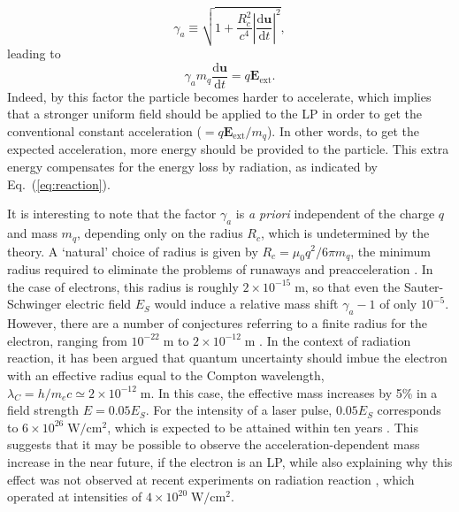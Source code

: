 \documentclass[a4paper,fleqn]{cas-sc}
\begin{document}
\begin{equation}
\gamma_{a} \equiv \sqrt{1 + \displaystyle\frac{R_{c}^{2}}{c^{4}} \left|\displaystyle\frac{\mathrm{d}\mathbf{u}}{\mathrm{d}t}\right|^{2}} , \label{eq:gamma}
\end{equation}
leading to
\begin{equation}
\gamma_{a} m_{q} \displaystyle\frac{\mathrm{d}\mathbf{u}}{\mathrm{d}t} = q\mathbf{E}_{\mathrm{ext}} . \label{eq:motion2}
\end{equation}
Indeed, by this factor the particle becomes harder to accelerate, which implies that a stronger uniform field should be applied to the LP in order to get the conventional constant acceleration ($=q\mathbf{E}_{\mathrm{ext}}/m_{q}$). In other words, to get the expected acceleration, more energy should be provided to the particle. This extra energy compensates for the energy loss by radiation, as indicated by Eq.~(\ref{eq:reaction}).

It is interesting to note that the factor $\gamma_{a}$ is {\it a priori} independent of the charge $q$ and mass $m_{q}$, depending only on the radius $R_{c}$, which is undetermined by the theory. A `natural' choice of radius is given by $R_{c}=\mu_{0}q^{2}/6\pi m_{q}$, the minimum radius required to eliminate the problems of runaways and preacceleration \cite{Levine1977}. In the case of electrons, this radius is roughly $2\times 10^{-15} \;\mathrm{m}$, so that even the Sauter-Schwinger electric field $E_S$ would induce a relative mass shift $\gamma_a-1$ of only $10^{-5}$. However, there are a number of conjectures referring to a finite radius for the electron, ranging from $10^{-22} \;\mathrm{m}$ to $2\times 10^{-12} \;\mathrm{m}$ \cite{Dehmelt1988,Compton1919,Lake2015}. In the context of radiation reaction, it has been argued \cite{Moniz1977} that quantum uncertainty should imbue the electron with an effective radius equal to the Compton wavelength, $\lambda_C=h/m_e c\simeq 2\times 10^{-12} \;\mathrm{m}$. In this case, the effective mass increases by 5\% in a field strength $E=0.05 E_S$. For the intensity of a laser pulse, $0.05 E_{S}$ corresponds to $6\times 10^{26} \;\mathrm{W}/\mathrm{cm}^{2}$, which is expected to be attained within ten years \cite{Mourou2019}. This suggests that it may be possible to observe the acceleration-dependent mass increase in the near future, if the electron is an LP, while also explaining why this effect was not observed at recent experiments on radiation reaction \cite{Cole2018,Poder2018}, which operated at intensities of $4\times 10^{20} \;\mathrm{W}/\mathrm{cm}^{2}$.
\end{document}
